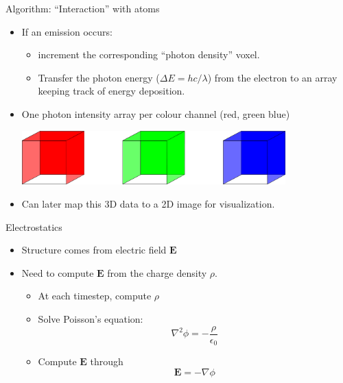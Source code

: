 \documentclass[xcolor=pdftex,dvipsnames,table,usenames,11pt]{beamer}
\renewcommand{\vec}[1]{\ensuremath{\mathbf{#1}}}
\begin{document}
\begin{frame}{Algorithm: ``Interaction'' with atoms}
\begin{itemize}
\item If an emission occurs:
\begin{itemize}
\pause
\item increment the corresponding ``photon density'' voxel. 
\pause
\item Transfer the photon energy ($\Delta E = hc/\lambda$) from the electron to an array keeping track of energy deposition.
\end{itemize}
\pause
\item One photon intensity array per colour channel (red, green blue)
\begin{center}
\includegraphics[width=0.8\textwidth]{img/photon_density.pdf}
\end{center}
\item Can later map this 3D data to a 2D image for visualization.
\end{itemize}
\end{frame}

















\begin{frame}{Electrostatics}
\begin{itemize}
\item Structure comes from electric field $\vec E$
\item Need to compute $\vec E$ from the charge density $\rho$.
\begin{itemize}
\item{At each timestep, compute $\rho$}
\item {Solve Poisson's equation:}
\begin{equation*}
\nabla^2\phi = -\frac{\rho}{\epsilon_0}
\end{equation*}
\item Compute $\vec E$ through 
\begin{equation*}
\vec E = -\nabla \phi
\end{equation*}


\end{itemize}

\end{itemize}
\end{frame}
\end{document}
